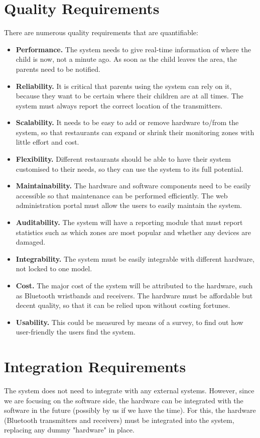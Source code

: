 \documentclass[11pt,titlepage]{article}
\begin{document}
\section{Quality Requirements}
There are numerous quality requirements that are quantifiable:
\begin{itemize}
\item \textbf{Performance.} The system needs to give real-time information of where the child is now, not a minute ago. As soon as the child leaves the area, the parents need to be notified.
\item \textbf{Reliability.} It is critical that parents using the system can rely on it, because they want to be certain where their children are at all times. The system must always report the correct location of the transmitters.
\item \textbf{Scalability.} It needs to be easy to add or remove hardware to/from the system, so that restaurants can expand or shrink their monitoring zones with little effort and cost.
\item \textbf{Flexibility.} Different restaurants should be able to have their system customised to their needs, so they can use the system to its full potential.
\item \textbf{Maintainability.} The hardware and software components need to be easily accessible so that maintenance can be performed efficiently. The web administration portal must allow the users to easily maintain the system.
\item \textbf{Auditability.} The system will have a reporting module that must report statistics such as which zones are most popular and whether any devices are damaged.
\item \textbf{Integrability.} The system must be easily integrable with different hardware, not locked to one model.
\item \textbf{Cost.} The major cost of the system will be attributed to the hardware, such as Bluetooth wristbands and receivers. The hardware must be affordable but decent quality, so that it can be relied upon without costing fortunes.
\item \textbf{Usability.} This could be measured by means of a survey, to find out how user-friendly the users find the system.
\end{itemize}

\section{Integration Requirements}
The system does not need to integrate with any external systems. However, since we are focusing on the software side, the hardware can be integrated with the software in the future (possibly by us if we have the time). For this, the hardware (Bluetooth transmitters and receivers) must be integrated into the system, replacing any dummy "hardware" in place.
\end{document}
